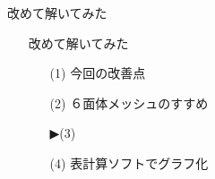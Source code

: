 \begin{frame}{改めて解いてみた}
  \begin{itemize}
      \item[] 改めて解いてみた
      \begin{itemize}[itemsep=1.3ex, leftmargin=1cm]
        \item[(1)]  {\color{cud_lightgray}今回の改善点}
	\item[(2)]  {\color{cud_lightgray}６面体メッシュのすすめ}
	\item[▶(3)]  
	\item[(4)]  {\color{cud_lightgray}表計算ソフトでグラフ化}
      \end{itemize}
  \end{itemize}
\end{frame}
